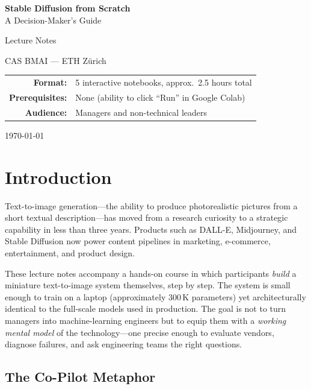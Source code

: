 \documentclass[11pt,a4paper]{article}
\begin{document}
\begin{titlepage}
\centering
\vspace*{3cm}
{\Huge\bfseries Stable Diffusion from Scratch\\[0.4em]}
{\LARGE\color{cBlue} A Decision-Maker's Guide}

\vspace{2cm}
{\Large Lecture Notes}

\vspace{1.5cm}
{\large CAS BMAI --- ETH Z\"urich}

\vspace{3cm}
\begin{tabular}{rl}
\textbf{Format:} & 5 interactive notebooks, approx.\ 2.5 hours total \\
\textbf{Prerequisites:} & None (ability to click ``Run'' in Google Colab) \\
\textbf{Audience:} & Managers and non-technical leaders \\
\end{tabular}

\vfill
{\small \today}
\end{titlepage}

\tableofcontents
\newpage

\section{Introduction}
\label{sec:intro}

Text-to-image generation---the ability to produce photorealistic pictures
from a short textual description---has moved from a research curiosity to a
strategic capability in less than three years.  Products such as DALL-E,
Midjourney, and Stable Diffusion now power content pipelines in marketing,
e-commerce, entertainment, and product design.

These lecture notes accompany a hands-on course in which participants
\emph{build} a miniature text-to-image system themselves, step by step.
The system is small enough to train on a laptop (approximately 300\,K
parameters) yet architecturally identical to the full-scale models used
in production.  The goal is not to turn managers into machine-learning
engineers but to equip them with a \emph{working mental model} of the
technology---one precise enough to evaluate vendors, diagnose failures,
and ask engineering teams the right questions.

\subsection{The Co-Pilot Metaphor}
\end{document}
